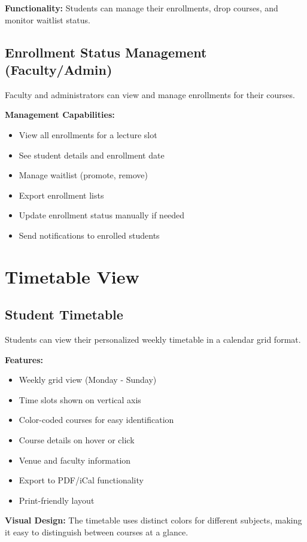 \textbf{Functionality:} Students can manage their enrollments, drop courses, and monitor waitlist status.

\subsection{Enrollment Status Management (Faculty/Admin)}
Faculty and administrators can view and manage enrollments for their courses.

\textbf{Management Capabilities:}
\begin{itemize}
    \item View all enrollments for a lecture slot
    \item See student details and enrollment date
    \item Manage waitlist (promote, remove)
    \item Export enrollment lists
    \item Update enrollment status manually if needed
    \item Send notifications to enrolled students
\end{itemize}

\section{Timetable View}

\subsection{Student Timetable}
Students can view their personalized weekly timetable in a calendar grid format.

\textbf{Features:}
\begin{itemize}
    \item Weekly grid view (Monday - Sunday)
    \item Time slots shown on vertical axis
    \item Color-coded courses for easy identification
    \item Course details on hover or click
    \item Venue and faculty information
    \item Export to PDF/iCal functionality
    \item Print-friendly layout
\end{itemize}

\textbf{Visual Design:} The timetable uses distinct colors for different subjects, making it easy to distinguish between courses at a glance.

